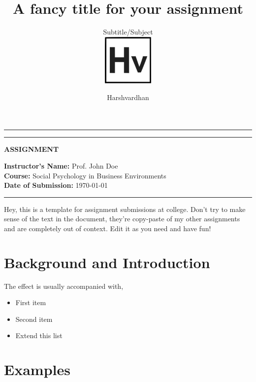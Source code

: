 \documentclass[a4paper,english,12pt]{paper}
\title{A fancy title for your assignment}
\subtitle{Subtitle/Subject\\
\hfill\includegraphics[height=2.5cm]{logo}
\vspace{-3cm}}
\author{Harshvardhan}
\begin{document}
 
\vspace{-3.5cm}
\maketitle
\hrule \hrule
\medskip
\vspace{-0.2cm}

\begin{center}
\textbf{ASSIGNMENT}
\end{center}
\vspace{-0.3cm}
\textbf{Instructor's Name:} Prof. John Doe\\
\textbf{Course:} Social Psychology in Business Environments\\
\textbf{Date of Submission:} \today    %


\medskip
\hrule
\hspace{1cm}

Hey, this is a template for assignment submissions at college. Don't try to make sense of the text in the document, they're copy-paste of my other assignments and are completely out of context. Edit it as you need and have fun!

\blindtext[2]  %


\medskip
\begin{tcolorbox}[colback=blue!3!white,colframe=blue(ryb)!50!black,title=\textbf{Definition}]

\blindtext
\end{tcolorbox}

\section{Background and Introduction}


The effect is usually accompanied with, 

\begin{itemize}
    \item First item
    \item Second item
    \item Extend this list
\end{itemize}


\section*{Examples}    %
\end{document}
